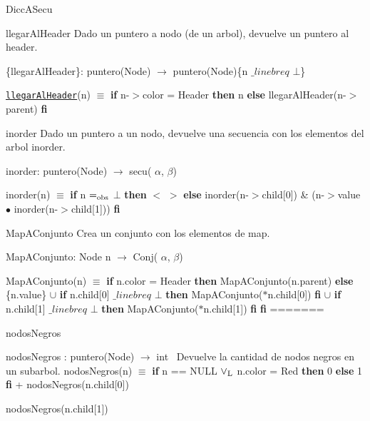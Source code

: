 \begin{DoxyParagraph}{\-Dicc\-A\-Secu}
\begin{DoxyParagraph}{llegar\-Al\-Header}
\-Dado un puntero a nodo (de un arbol), devuelve un puntero al header.
\end{DoxyParagraph}
\{llegar\-Al\-Header\}\-: puntero(\-Node) $\to$ puntero(\-Node)\{n $\_linebr eq$ $\bot$\}\par
 \href{axiomas.html#llegarAlHeader}{\tt llegar\-Al\-Header}(n) $\equiv$ {\bfseries if} n-\/$>$color = \-Header {\bfseries then} n {\bfseries else} llegar\-Al\-Header(n-\/$>$parent) {\bfseries fi} 

\begin{DoxyParagraph}{inorder}
\-Dado un puntero a un nodo, devuelve una secuencia con los elementos del arbol inorder.
\end{DoxyParagraph}
inorder\-: puntero(\-Node) $\to$ secu( $\alpha$, $\beta$)\par
 inorder(n) $\equiv$ {\bfseries if} n $=_{\rm obs}$ $\bot$ {\bfseries then} $<$ $>$ {\bfseries else} inorder(n-\/$>$child\mbox{[}0\mbox{]}) \& (n-\/$>$value $\bullet$ inorder(n-\/$>$child\mbox{[}1\mbox{]})) {\bfseries fi} 

\begin{DoxyParagraph}{\-Map\-A\-Conjunto}
\-Crea un conjunto con los elementos de map.
\end{DoxyParagraph}
\-Map\-A\-Conjunto\-: \-Node n $\to$ \-Conj( $\alpha$, $\beta$)\par
 \-Map\-A\-Conjunto(n) $\equiv$ {\bfseries if} n.\-color = \-Header {\bfseries then} \-Map\-A\-Conjunto(n.\-parent) {\bfseries else} \{n.\-value\} $\cup$ {\bfseries if} n.\-child\mbox{[}0\mbox{]} $\_linebr eq$ $\bot$ {\bfseries then} \-Map\-A\-Conjunto($\ast$n.child\mbox{[}0\mbox{]}) {\bfseries fi} $\cup$ {\bfseries if} n.\-child\mbox{[}1\mbox{]} $\_linebr eq$ $\bot$ {\bfseries then} \-Map\-A\-Conjunto($\ast$n.child\mbox{[}1\mbox{]}) {\bfseries fi} {\bfseries fi} 
=======


\begin{DoxyParagraph}{nodos\+Negros}


nodos\+Negros \+: puntero(\+Node) $\to$ int~\newline
Devuelve la cantidad de nodos negros en un subarbol. nodos\+Negros(n) $\equiv$ {\bfseries if} n == N\+U\+LL $\lor_{\rm L}$ n.\+color = Red {\bfseries then} 0 {\bfseries else} 1 {\bfseries fi} + nodos\+Negros(n.\+child\mbox{[}0\mbox{]})
\begin{DoxyItemize}
\item nodos\+Negros(n.\+child\mbox{[}1\mbox{]}) 
\end{DoxyItemize}
\end{DoxyParagraph}



\end{DoxyParagraph}
